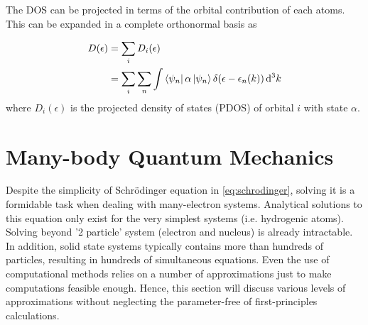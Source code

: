     The DOS can be projected in terms of the orbital contribution of each atoms. This can be expanded in a complete orthonormal basis as \citep{Enkovaara2010}

    \begin{align}
        D(\epsilon) &= \sum_i D_i(\epsilon) \\
        &= \sum_i \sum_n \int \bra{\psi_n} \alpha \ket{\psi_n}  \delta(\epsilon - \epsilon_n(k)) \dd[3]{k}
    \end{align}
    where $D_i(\epsilon)$ is the projected density of states (PDOS) of orbital $i$ with state $\alpha$. 
     
\section{Many-body Quantum Mechanics}
Despite the simplicity of Schr\"{o}dinger equation in \eqref{eq:schrodinger}, solving it is a formidable task when dealing with many-electron systems. Analytical solutions to this equation only exist for the very simplest systems (i.e. hydrogenic atoms). Solving beyond '2 particle' system (electron and nucleus) is already intractable. In addition, solid state systems typically contains more than hundreds of particles, resulting in hundreds of simultaneous equations. Even the use of computational methods relies on a number of approximations just to make computations feasible enough. Hence, this section will discuss various levels of approximations without neglecting the parameter-free of first-principles calculations. 


